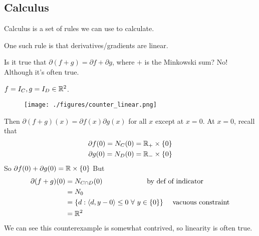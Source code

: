 \documentclass[class=article,crop=false]{standalone}
\begin{document}
\newpage
\subsection{Calculus}

\begin{remark}
Calculus is a set of rules we can use to calculate.
\end{remark}

One such rule is that derivatives/gradients are linear.

Is it true that $ \partial (f+g) = \partial f+\partial g$, where $ +$ is the Minkowski sum? No! Although it's often true.

\begin{eg}
$ f=I_C, g= I_D \in \mathbb{R}^{2}$. 
~\begin{figure}[H]
	\centering
	\texttt{[image: ./figures/counter\_linear.png]}
\end{figure}

Then $ \partial (f+g)(x) = \partial f(x) \partial g(x)$ for all $ x$ except at  $ x=0$. At  $ x=0$, recall that 
 \begin{align*}
	 \partial f(0) = N_C(0) &= \mathbb{R}_{+} \times \{0\} \\
	 \partial g(0) = N_D(0) &= \mathbb{R}_{-} \times \{0\} 
\end{align*}
So $ \partial f(0) + \partial g(0) = \mathbb{R} \times \{0\} $ 
But
\begin{align*}
	\partial (f+g) (0) &= N_{C \cap D}(0) \qquad \qquad \qquad  \text{ by def of indicator} \\
	&= N_{0} \\
	&= \{d: \langle d,y-0 \rangle \leq 0 \ \forall \ y \in \{0\} \} \quad  \text{ vacuous constraint} \\
	&= \mathbb{R}^2 
\end{align*}
We can see this counterexample is somewhat contrived, so linearity is often true.
\end{eg}
\end{document}

